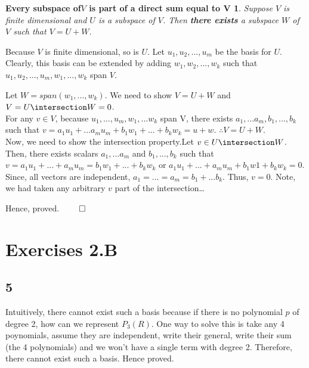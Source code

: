 \documentclass{report}
\begin{document}
\newtheorem{subspace-and-another-sum-to-space}{Every subspace of$V$ is part of a direct sum equal to V}
\begin{subspace-and-another-sum-to-space}
Suppose $V$ is finite dimensional and $U$ is a subspace of $V$. Then \textbf{there exists} a subspace $W$ of $V$ such that $V = U + W$. 
\end{subspace-and-another-sum-to-space}


Because $V$ is finite dimensional, so is $U$. Let $u_1, u_2, ..., u_m$ be the basis for $U$. Clearly, this basis can be extended by adding $w_1, w_2, ..., w_k$ such that $u_1, u_2, ..., u_m, w_1, ..., w_k$ span $V$. 

Let $W=span(w_1,...,w_k)$. We need to show $V = U + W$ and $V = U \intersection W = {0}$.\\ 
For any $v \in V$, because $u_1,...,u_m,w_1,...w_k$ span V, there exists $a_1,...a_m,b_1,...,b_k$ such that $v = a_1u_1 + ... a_mu_m + b_1w_1 + ... + b_kw_k = u + w$. $\therefore V = U + W$.\\
Now, we need to show the intersection property.Let $v \in U \intersection W$. Then, there exists scalars $a_1,...a_m$ and $b_1,...,b_k$ such that \\
$v = a_1u_1 + ... + a_mu_m = b_1w_1 + ... + b_kw_k$ or $a_1u_1 + ... + a_mu_m + b_1w1 + b_kw_k = 0$. Since, all vectors are independent, $a_1 = ... = a_m = b_1 + ... b_k$. Thus, $v=0$. Note, we had taken any arbitrary $v$ part of the intersection\dots

Hence, proved. $\qed$


\section*{Exercises 2.B}
\subsection*{5}
Intuitively, there cannot exist such a basis because if there is no polynomial $p$ of degree 2, how can we represent $P_3(R)$. One way to solve this is take any 4 poynomials, assume they are independent, write their general, write their sum (the 4 polynomials) and we won't have a single term with degree 2. Therefore, there cannot exist such a basis. Hence proved.
\end{document}

